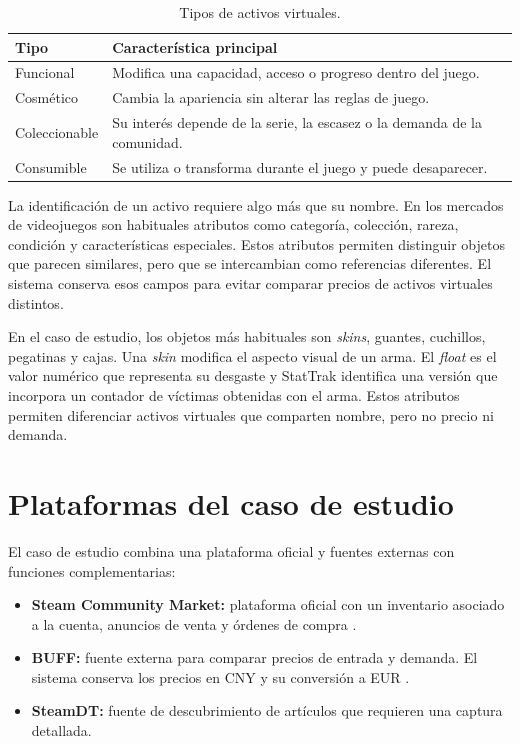 \begin{table}[h]
\centering
\begin{tabularx}{\textwidth}{>{\raggedright\arraybackslash}p{} >{\raggedright\arraybackslash}X}
\toprule
Tipo & Característica principal \\
\midrule
Funcional & Modifica una capacidad, acceso o progreso dentro del juego. \\
Cosmético & Cambia la apariencia sin alterar las reglas de juego. \\
Coleccionable & Su interés depende de la serie, la escasez o la demanda de la comunidad. \\
Consumible & Se utiliza o transforma durante el juego y puede desaparecer. \\
\bottomrule
\end{tabularx}
\caption{Tipos de activos virtuales.}
\label{tab:tipos-activos}
\end{table}

La identificación de un activo requiere algo más que su nombre. En los mercados de videojuegos son habituales atributos como categoría, colección, rareza, condición y características especiales. Estos atributos permiten distinguir objetos que parecen similares, pero que se intercambian como referencias diferentes. El sistema conserva esos campos para evitar comparar precios de activos virtuales distintos.

En el caso de estudio, los objetos más habituales son \emph{skins}, guantes, cuchillos, pegatinas y cajas. Una \emph{skin} modifica el aspecto visual de un arma. El \emph{float} es el valor numérico que representa su desgaste y StatTrak identifica una versión que incorpora un contador de víctimas obtenidas con el arma. Estos atributos permiten diferenciar activos virtuales que comparten nombre, pero no precio ni demanda.

\section{Plataformas del caso de estudio}

El caso de estudio combina una plataforma oficial y fuentes externas con funciones complementarias:
\begin{itemize}
    \item \textbf{Steam Community Market:} plataforma oficial con un inventario asociado a la cuenta, anuncios de venta y órdenes de compra \cite{steamMarketFAQ}.
    \item \textbf{BUFF:} fuente externa para comparar precios de entrada y demanda. El sistema conserva los precios en CNY y su conversión a EUR \cite{buffMarketplace}.
    \item \textbf{SteamDT:} fuente de descubrimiento de artículos que requieren una captura detallada.
\end{itemize}

